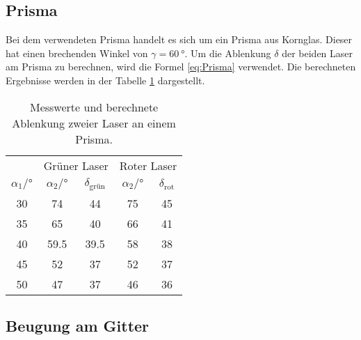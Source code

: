 \subsection{Prisma}

Bei dem verwendeten Prisma handelt es sich um ein Prisma aus Kornglas.
Dieser hat einen brechenden Winkel von $\gamma = \qty{60}{°}$.
Um die Ablenkung $\delta$ der beiden Laser am Prisma zu berechnen, wird die Formel \ref{eq:Prisma} verwendet.
Die berechneten Ergebnisse werden in der Tabelle \ref{tab:Prisma} dargestellt.

\begin{table}[H]
  \centering
  \caption{Messwerte und berechnete Ablenkung zweier Laser an einem Prisma.}
  \label{tab:Prisma}
  \begin{tabular}{c c c c c}
    \toprule
  & \multicolumn{2}{c}{Grüner Laser} & \multicolumn{2}{c}{Roter Laser} \\
\cmidrule(lr){2-3}\cmidrule(lr){4-5}
    $\alpha_1 / °$ & $\alpha_2  /° $ & $\delta_\text{grün}$ &  $\alpha_2  /°$ & $\delta_\text{rot}$ \\
    \midrule
    30 & 74    & 44   & 75 & 45 \\  
    35 & 65    & 40   & 66 & 41 \\    
    40 & 59.5  & 39.5 & 58 & 38 \\  
    45 & 52    & 37   & 52 & 37 \\  
    50 & 47    & 37   & 46 & 36 \\   
    \bottomrule
  \end{tabular}
\end{table}


\subsection{Beugung am Gitter}

